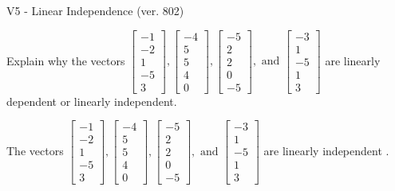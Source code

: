 \begin{exercise}
  \begin{exerciseTitle}V5 - Linear Independence (ver. 802)\end{exerciseTitle}
  \begin{exerciseStatement}
    Explain why the vectors \(\left[\begin{array}{r}
-1 \\
-2 \\
1 \\
-5 \\
3
\end{array}\right] , \left[\begin{array}{r}
-4 \\
5 \\
5 \\
4 \\
0
\end{array}\right] , \left[\begin{array}{r}
-5 \\
2 \\
2 \\
0 \\
-5
\end{array}\right] , \text{ and } \left[\begin{array}{r}
-3 \\
1 \\
-5 \\
1 \\
3
\end{array}\right]\) are linearly dependent or linearly independent.	


  \end{exerciseStatement}
  \begin{exerciseAnswer}
   The vectors \(\left[\begin{array}{r}
-1 \\
-2 \\
1 \\
-5 \\
3
\end{array}\right] , \left[\begin{array}{r}
-4 \\
5 \\
5 \\
4 \\
0
\end{array}\right] , \left[\begin{array}{r}
-5 \\
2 \\
2 \\
0 \\
-5
\end{array}\right] , \text{ and } \left[\begin{array}{r}
-3 \\
1 \\
-5 \\
1 \\
3
\end{array}\right]\) are 
  	 linearly independent  .
  


  \end{exerciseAnswer}
\end{exercise}